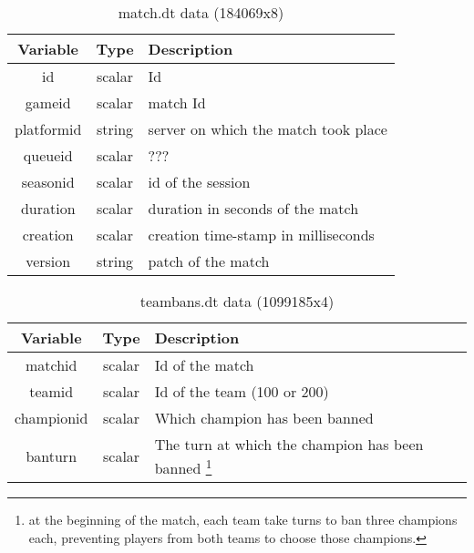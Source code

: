 \begin{longtable}{|c|c|l|}
        \caption{match.dt data (184069x8)}
        \label{tab:match.dt} \\
        
        \hline
        Variable & Type & Description\\
        \hline
        \endfirsthead
        
        \hline
        id              & scalar        & Id\\
        gameid          & scalar        & match Id\\
        platformid      & string        & server on which the match took place\\
        queueid         & scalar        & ???\\
        seasonid        & scalar        & id of the session\\
        duration        & scalar        & duration in seconds of the match\\
        creation        & scalar        & creation time-stamp in milliseconds\\
        version         & string        & patch of the match\\
        \hline
\end{longtable}

\begin{longtable}{|c|c|l|}
        \caption{teambans.dt data (1099185x4)}
        \label{tab:teambans.dt} \\
        
        \hline
        Variable & Type & Description\\
        \hline
        \endfirsthead
        
        \hline
        matchid           & scalar          & Id of the match \\
        teamid            & scalar          & Id of the team (100 or 200) \\
        championid        & scalar          & Which champion has been banned \\
        banturn           & scalar          & The turn at which the champion has been banned \footnote{at the beginning of the match, each team take turns to ban three champions each, preventing players from both teams to choose those champions.} \\
        \hline
\end{longtable}

